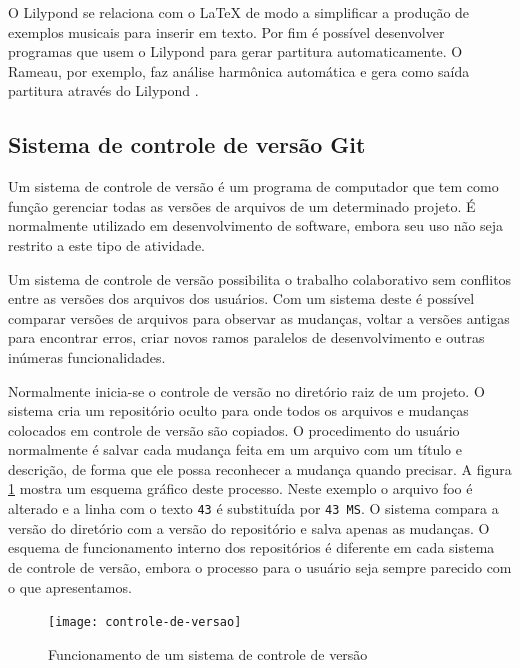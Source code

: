O Lilypond se relaciona com o \LaTeX{} de modo a simplificar a
produção de exemplos musicais para inserir em texto. Por fim é
possível desenvolver programas que usem o Lilypond para gerar
partitura automaticamente. O Rameau, por exemplo, faz análise
harmônica automática e gera como saída partitura através do Lilypond
\cite{kroger08:rameau}.

\subsection{Sistema de controle de versão Git}
\label{sec:sistema-de-controle}

Um sistema de controle de versão é um programa de computador que tem
como função gerenciar todas as versões de arquivos de um determinado
projeto. É normalmente utilizado em desenvolvimento de software,
embora seu uso não seja restrito a este tipo de atividade.

Um sistema de controle de versão possibilita o trabalho colaborativo
sem conflitos entre as versões dos arquivos dos usuários. Com um
sistema deste é possível comparar versões de arquivos para observar as
mudanças, voltar a versões antigas para encontrar erros, criar novos
ramos paralelos de desenvolvimento e outras inúmeras funcionalidades.

Normalmente inicia-se o controle de versão no diretório raiz de um
projeto. O sistema cria um repositório oculto para onde todos os
arquivos e mudanças colocados em controle de versão são copiados. O
procedimento do usuário normalmente é salvar cada mudança feita em um
arquivo com um título e descrição, de forma que ele possa reconhecer a
mudança quando precisar. A figura \ref{fig:controle-de-versao} mostra
um esquema gráfico deste processo. Neste exemplo o arquivo foo é
alterado e a linha com o texto \verb!43! é substituída por
\verb!43 MS!. O sistema compara a versão do diretório com a versão do
repositório e salva apenas as mudanças. O esquema de funcionamento
interno dos repositórios é diferente em cada sistema de controle de
versão, embora o processo para o usuário seja sempre parecido com o
que apresentamos.

\begin{figure}
  \centering
  \texttt{[image: controle-de-versao]}
  \caption{Funcionamento de um sistema de controle de versão}
  \label{fig:controle-de-versao}
\end{figure}

